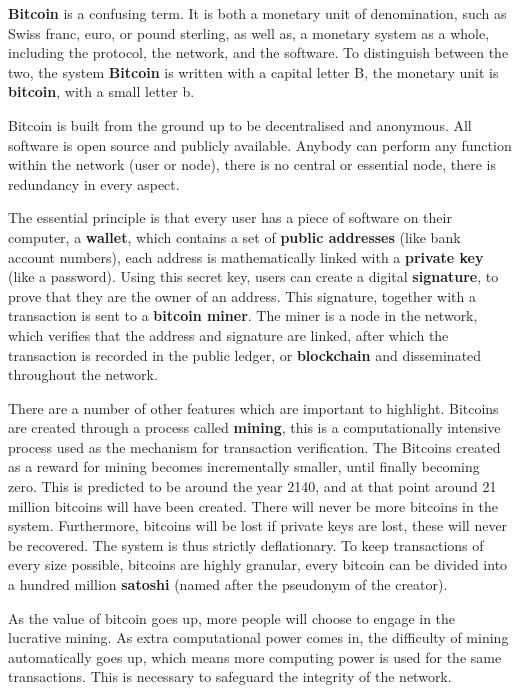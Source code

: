 \documentclass[12pt]{article}\usepackage[]{graphicx}\usepackage[]{color}
\begin{document}
\textbf{Bitcoin} is a confusing term.
It is both a monetary unit of denomination,
such as Swiss franc, euro, or pound sterling,
as well as, a monetary system as a whole, including the protocol, the network, and the software.
To distinguish between the two, the system \textbf{Bitcoin} is written with a capital letter B,
the monetary unit is \textbf{bitcoin}, with a small letter b.

Bitcoin is built from the ground up to be decentralised and anonymous.
All software is open source and publicly available.
Anybody can perform any function within the network (user or node),
there is no central or essential node,
there is redundancy in every aspect.

The essential principle is that every user has a piece of software on their computer, a \textbf{wallet},
which contains a set of \textbf{public addresses} (like bank account numbers),
each address is mathematically linked with a \textbf{private key} (like a password).
Using this secret key, users can create a digital \textbf{signature}, 
to prove that they are the owner of an address.
This signature, together with a transaction is sent to a \textbf{bitcoin miner}.
The miner is a node in the network,
which verifies that the address and signature are linked,
after which the transaction is recorded in the public ledger,
or \textbf{blockchain} and disseminated throughout the network.

There are a number of other features which are important to highlight.
Bitcoins are created through a process called \textbf{mining},
this is a computationally intensive process used as the mechanism for transaction verification.
The Bitcoins created as a reward for mining becomes incrementally smaller, until finally becoming zero.
This is predicted to be around the year 2140, and at that point around 21 million bitcoins will have been created.
There will never be more bitcoins in the system.
Furthermore, bitcoins will be lost if private keys are lost, these will never be recovered.
The system is thus strictly deflationary.
To keep transactions of every size possible, bitcoins are highly granular,
every bitcoin can be divided into a hundred million \textbf{satoshi} (named after the pseudonym of the creator).

As the value of bitcoin goes up, more people will choose to engage in the lucrative mining.
As extra computational power comes in, the difficulty of mining automatically goes up,
which means more computing power is used for the same transactions.
This is necessary to safeguard the integrity of the network.
\end{document}
